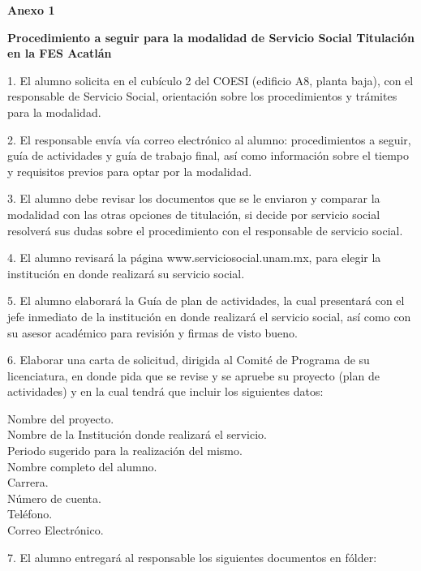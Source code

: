 \begin{footnotesize}
\textbf{Anexo 1}

\textbf{Procedimiento a seguir para la modalidad de Servicio Social
Titulación en la FES Acatlán}

\begin{Obs}
\item[1.] El alumno solicita en el cubículo 2 del COESI (edificio A8, planta baja),
con el responsable de Servicio Social, orientación sobre los procedimientos
y trámites para la modalidad. 

\item[2.] El responsable envía vía correo electrónico al alumno: procedimientos a
seguir, guía de actividades y guía de trabajo final, así como información
sobre el tiempo y requisitos previos para optar por la modalidad. 

\item[3.] El alumno debe revisar los documentos que se le enviaron y comparar la
modalidad con las otras opciones de titulación, si decide por servicio
social resolverá sus dudas sobre el procedimiento con el responsable de
servicio social. 

\item[4.] El alumno revisará la página www.serviciosocial.unam.mx, para elegir la
institución en donde realizará su servicio social. 

\item[5.] El alumno elaborará la Guía de plan de actividades, la cual presentará
con el jefe inmediato de la institución en donde realizará el servicio
social, así como con su asesor académico para revisión y firmas de visto
bueno. 

\item[6.] Elaborar una carta de solicitud, dirigida al Comité de Programa de su
licenciatura, en donde pida que se revise y se apruebe su proyecto (plan de
actividades) y en la cual tendrá que incluir los siguientes datos: 

Nombre del proyecto.\\
Nombre de la Institución donde realizará el servicio.\\
Periodo sugerido para la realización del mismo.\\ 
Nombre completo del alumno.\\
Carrera.\\ 
Número de cuenta.\\
Teléfono.\\ 
Correo Electrónico.

\item[7.] El alumno entregará al responsable los siguientes documentos en fólder: 


\end{Obs}
\end{footnotesize}
